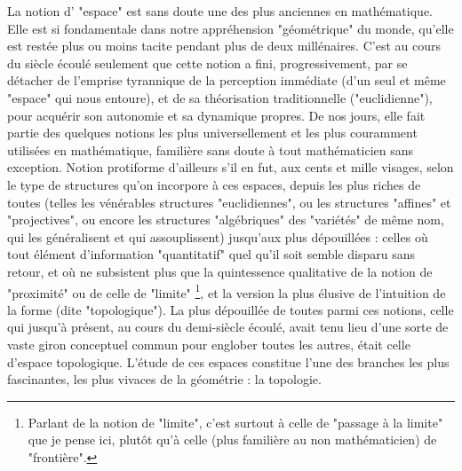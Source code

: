 La notion d' "espace" est sans doute une des plus anciennes en mathématique. Elle est si fondamentale dans notre appréhension "géométrique" du monde, qu'elle est restée plus ou moins tacite pendant plus de deux millénaires. C'est au cours du siècle écoulé seulement que cette notion a fini, progressivement, par se détacher de l'emprise tyrannique de la perception immédiate (d'un seul et même "espace" qui nous entoure), et de sa théorisation traditionnelle ("euclidienne"), pour acquérir son autonomie et sa dynamique propres. De nos jours, elle fait partie des quelques notions les plus universellement et les plus couramment utilisées en mathématique, familière sans doute à tout mathématicien sans exception. Notion protiforme d'ailleurs s'il en fut, aux cents et mille visages, selon le type de structures qu'on incorpore à ces espaces, depuis les plus riches de toutes (telles les vénérables structures "euclidiennes", ou les structures "affines" et "projectives", ou encore les structures "algébriques" des "variétés" de même nom, qui les généralisent et qui assouplissent) jusqu'aux plus dépouillées : celles où tout élément d'information "quantitatif" quel qu'il soit semble disparu sans retour, et où ne subsistent plus que la quintessence qualitative de la notion de "proximité" ou de celle de "limite" \footnote{Parlant de la notion de "limite", c'est surtout à celle de "passage à la limite" que je pense ici, plutôt qu'à celle (plus familière au non mathématicien) de "frontière".}, et la version la plus élusive de l'intuition de la forme (dite "topologique"). La plus dépouillée de toutes parmi ces notions, celle qui jusqu'à présent, au cours du demi-siècle écoulé, avait tenu lieu d'une sorte de vaste giron conceptuel commun pour englober toutes les autres, était celle d'espace topologique. L'étude de ces espaces constitue l'une des branches les plus fascinantes, les plus vivaces de la géométrie : la topologie.

